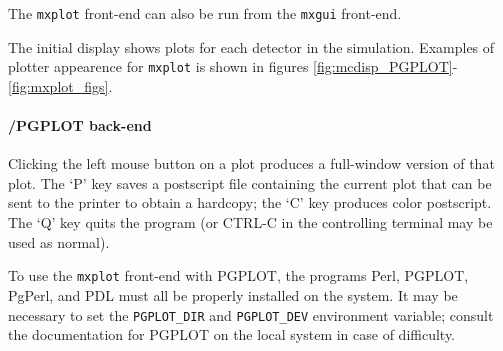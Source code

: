 The \verb+mxplot+ front-end can also be run from the \verb+mxgui+ front-end.

The initial display shows plots for each detector in the simulation.
Examples of plotter appearence for \verb+mxplot+ is shown in figures
 \ref{fig:mcdisp_PGPLOT}-\ref{fig:mxplot_figs}.

\paragraph{\MCX /PGPLOT back-end}
Clicking the left mouse button on a plot produces a full-window version
of that plot. The `P' key saves a postscript file containing the current
plot that can be sent to the printer to obtain a hardcopy; the `C' key
produces color postscript.
The `Q' key quits the program (or CTRL-C in the controlling
terminal may be used as normal).

To use the \verb+mxplot+ front-end with PGPLOT, the programs Perl, PGPLOT,
PgPerl, and PDL must all be properly installed on the system.  It may be
necessary to set the \verb+PGPLOT_DIR+ and \verb+PGPLOT_DEV+ environment
variable; consult the documentation for PGPLOT on the local system in case of
difficulty.   

%
%
%
%

